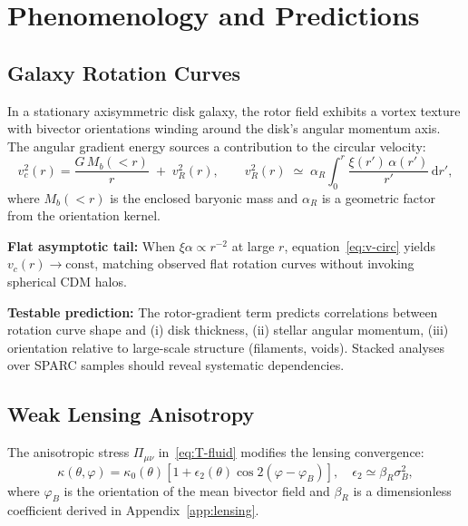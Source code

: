 \documentclass[11pt,a4paper]{article}
\numberwithin{equation}{section}
\theoremstyle{plain}
\theoremstyle{definition}
\theoremstyle{remark}
\newcommand{\dd}{\mathrm{d}}
\begin{document}
\vspace{1em}

\section{Phenomenology and Predictions}\label{sec:pheno}

\subsection{Galaxy Rotation Curves}

In a stationary axisymmetric disk galaxy, the rotor field exhibits a vortex texture with bivector orientations winding around the disk's angular momentum axis. The angular gradient energy sources a contribution to the circular velocity:
\begin{equation}
v_c^2(r)=\frac{G\,M_b(<r)}{r}\;+\; v_R^2(r),
\qquad
v_R^2(r)\;\simeq\; \alpha_R \int_0^r \frac{\xi(r')\,\alpha(r')}{r'}\,\dd r',
\label{eq:v-circ}
\end{equation}
where $M_b(<r)$ is the enclosed baryonic mass and $\alpha_R$ is a geometric factor from the orientation kernel.

\textbf{Flat asymptotic tail:} When $\xi\alpha\propto r^{-2}$ at large $r$, equation~\eqref{eq:v-circ} yields $v_c(r)\to\text{const}$, matching observed flat rotation curves without invoking spherical CDM halos.

\textbf{Testable prediction:} The rotor-gradient term predicts correlations between rotation curve shape and (i) disk thickness, (ii) stellar angular momentum, (iii) orientation relative to large-scale structure (filaments, voids). Stacked analyses over SPARC samples should reveal systematic dependencies.

\subsection{Weak Lensing Anisotropy}

The anisotropic stress $\Pi_{\mu\nu}$ in~\eqref{eq:T-fluid} modifies the lensing convergence:
\begin{equation}
\kappa(\theta,\varphi)=\kappa_0(\theta)\left[1+\epsilon_2(\theta)\cos 2(\varphi-\varphi_B)\right],\quad
\epsilon_2\simeq \beta_R\sigma_B^2,
\label{eq:kappa-quad}
\end{equation}
where $\varphi_B$ is the orientation of the mean bivector field and $\beta_R$ is a dimensionless coefficient derived in Appendix~\ref{app:lensing}.
\end{document}
